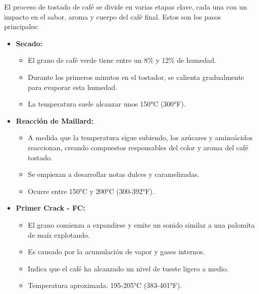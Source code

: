 \documentclass[
11pt, %
]{charter}
\begin{document}
El proceso de tostado de café se divide en varias etapas clave, cada una con un impacto en el sabor, aroma y cuerpo del café final. Estos son los pasos principales:
\begin{itemize}
	\item \textbf{Secado:}
		\begin{itemize}
		
			\item El grano de café verde tiene entre un 8\% y 12\% de humedad.
		
			\item Durante los primeros minutos en el tostador, se calienta gradualmente para 			evaporar esta humedad.
		
			\item La temperatura suele alcanzar unos 150°C (300°F).
			
		\end{itemize}
		
	\item \textbf{Reacción de Maillard:}
		\begin{itemize}
		
			\item A medida que la temperatura sigue subiendo, los azúcares y aminoácidos 					reaccionan, creando compuestos responsables del color y aroma del café tostado.
		
			\item Se empiezan a desarrollar notas dulces y caramelizadas.
		
			\item Ocurre entre 150°C y 200°C (300-392°F).
		
		\end{itemize}
		
	\item \textbf{Primer Crack - FC:}
		\begin{itemize}
		
			\item El grano comienza a expandirse y emite un sonido similar a una palomita de 			maíz explotando.
			
			\item Es causado por la acumulación de vapor y gases internos.
			
			\item Indica que el café ha alcanzado un nivel de tueste ligero a medio.
			
			\item Temperatura aproximada: 195-205°C (383-401°F).
		
		\end{itemize}
		

\end{itemize}
\end{document}

